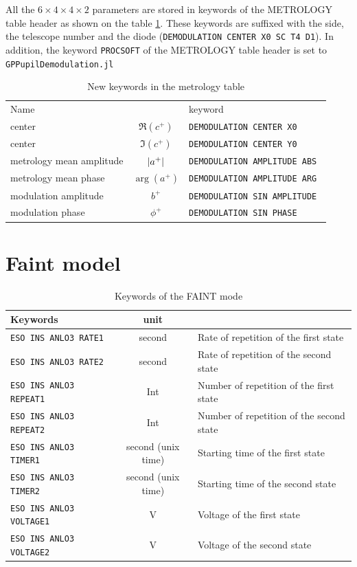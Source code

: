 \documentclass[a4paper,11pt,twoside]{scrartcl}
\begin{document}
All the $6\times4\times4\times2$ parameters are stored in keywords of the METROLOGY table header as shown on the table \ref{tab:keyword}. These keywords are suffixed with the side, the telescope number and the diode (\eg \verb|DEMODULATION CENTER X0 SC T4 D1|). In addition,  the keyword \verb|PROCSOFT| of the METROLOGY table header is set to \texttt{GPPupilDemodulation.jl}
\begin{table}[]
    \centering
    \begin{tabular}{l c l}
Name   &          & keyword   \\
center    &      $\Re(c^+)$        &   \verb|DEMODULATION CENTER X0|   \\
center   &      $\Im(c^+) $       &   \verb|DEMODULATION CENTER Y0|   \\
metrology mean amplitude  &      $\left\vert a^+\right\vert $       &   \verb|DEMODULATION AMPLITUDE ABS|   \\
metrology mean phase  &      $\arg{(a^+)} $       &   \verb|DEMODULATION AMPLITUDE ARG|   \\
modulation amplitude  &      $b^+ $       &   \verb|DEMODULATION SIN AMPLITUDE |   \\
modulation phase  &      $\phi^+ $       &   \verb|DEMODULATION SIN PHASE|   
    \end{tabular}
    \caption{New keywords in the metrology table}
    \label{tab:keyword}
\end{table}

\section{Faint model}

\begin{table}
    \centering
    \begin{tabular}{l c  l}
        Keywords                    & unit  &    \\
        \hline
    \verb|ESO INS ANLO3 RATE1|      & second    &  Rate of repetition of the first state \\     
    \verb|ESO INS ANLO3 RATE2|      & second    &  Rate of repetition of the second state \\	
    \verb|ESO INS ANLO3 REPEAT1|    & Int       &  Number of repetition of the first state\\ 
    \verb|ESO INS ANLO3 REPEAT2|    & Int       &  Number of repetition of the second state\\
    \verb|ESO INS ANLO3 TIMER1|     & second (unix time) &  Starting time of the first state   \\
    \verb|ESO INS ANLO3 TIMER2|     & second (unix time) &  Starting time of the second state \\
	\verb|ESO INS ANLO3 VOLTAGE1|   & V         &  Voltage of the first state \\
    \verb|ESO INS ANLO3 VOLTAGE2|   & V         &  Voltage of the second state
    \end{tabular}
    \caption{Keywords of the FAINT mode}
    \label{tab:faint}
\end{table}
\end{document}
